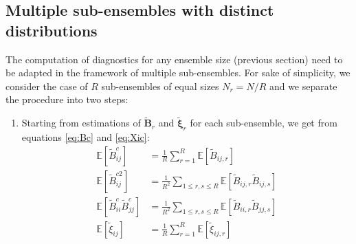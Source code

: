 \documentclass[12pt]{scrartcl}
\begin{document}
\subsection{Multiple sub-ensembles with distinct distributions}
The computation of diagnostics for any ensemble size (previous section) need to be adapted in the framework of multiple sub-ensembles. For sake of simplicity, we consider the case of $R$ sub-ensembles of equal sizes $N_r = N/R$ and we separate the procedure into two steps:
\begin{enumerate}
\item Starting from estimations of $\widetilde{\mathbf{B}}_r$ and $\widetilde{\boldsymbol{\xi}}_r$ for each sub-ensemble, we get from equations \eqref{eq:Bc} and \eqref{eq:Xic}:
\begin{subequations}
\begin{align}
\mathbb{E} \left[\widetilde{B}^c_{ij}\right] & = \frac{1}{R} \sum_{r=1}^R \mathbb{E} \left[\widetilde{B}_{ij,r}\right] \\
\mathbb{E} \left[\widetilde{B}^{c2}_{ij}\right] & = \frac{1}{R^2} \sum_{1 \le r,s \le R} \mathbb{E} \left[\widetilde{B}_{ij,r} \widetilde{B}_{ij,s}\right] \\
\mathbb{E} \left[\widetilde{B}^c_{ii} \widetilde{B}^c_{jj}\right] & = \frac{1}{R^2} \sum_{1 \le r,s \le R} \mathbb{E} \left[\widetilde{B}_{ii,r} \widetilde{B}_{jj,s}\right] \\
\mathbb{E} \left[\widetilde{\xi}_{ij}\right] & = \frac{1}{R} \sum_{r=1}^R \mathbb{E} \left[\widetilde{\xi}_{ij,r}\right]
\end{align}
\end{subequations}


\end{enumerate}
\end{document}
